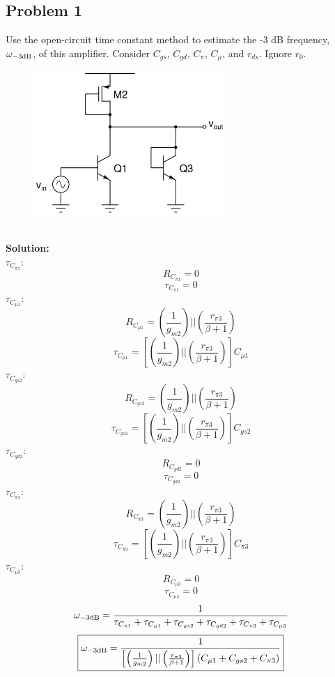 \documentclass{article}
\begin{document}
\subsection*{Problem 1}
Use the open-circuit time constant method to estimate the -3 dB frequency, $\omega_{\rm -3 dB}$, of this amplifier.  Consider $C_{gs}$, $C_{gd}$, $C_{\pi}$, $C_{\mu}$, and $r_{ds}$.  Ignore $r_0$. \\ 
\begin{figure}[!h]
\begin{center}
    \includegraphics[width=0.65\textwidth]{figures/cc_octc2.png}
\end{center}
\end{figure} \\
\textbf{Solution:} \\
$\tau_{C_{\pi 1}}$:
$$R_{C_{\pi 1}} = 0$$
$$\boxed{\tau_{C_{\pi 1}} = 0}$$
$\tau_{C_{\mu 1}}$:
$$R_{C_{\mu 1}} = \left(\frac{1}{g_{m2}}\right) || \left(\frac{r_{\pi 3}}{\beta + 1}\right) $$
$$\boxed{\tau_{C_{\mu 1}} = \left[\left(\frac{1}{g_{m2}}\right) || \left(\frac{r_{\pi 3}}{\beta + 1}\right)\right]C_{\mu 1}}$$
$\tau_{C_{gs2}}$:
$$R_{C_{gs2}} = \left(\frac{1}{g_{m2}}\right) || \left(\frac{r_{\pi 3}}{\beta + 1}\right) $$
$$\boxed{\tau_{C_{gs2}} = \left[\left(\frac{1}{g_{m2}}\right) || \left(\frac{r_{\pi 3}}{\beta + 1}\right)\right]C_{gs 2}}$$
$\tau_{C_{gd2}}$:
$$R_{C_{gd2}} = 0$$
$$\boxed{\tau_{C_{gd2}} = 0}$$
$\tau_{C_{\pi 3}}$:
$$R_{C_{\pi 3}} = \left(\frac{1}{g_{m2}}\right) || \left(\frac{r_{\pi 3}}{\beta + 1}\right) $$
$$\boxed{\tau_{C_{\pi 3}} = \left[\left(\frac{1}{g_{m2}}\right) || \left(\frac{r_{\pi 3}}{\beta + 1}\right)\right]C_{\pi 3}}$$
$\tau_{C_{\mu 3}}$:
$$R_{C_{\mu 3}} = 0 $$
$$\boxed{\tau_{C_{\mu 3}} = 0}$$
$$\omega_{\rm -3dB} = \frac{1}{\tau_{C_{\pi 1}} + \tau_{C_{\mu 1}} + \tau_{C_{gs2}} + \tau_{C_{gd2}} + \tau_{C_{\pi 3}} + \tau_{C_{\mu 3}}}$$
$$\boxed{\omega_{\rm -3 dB} = \frac{1}{\left[\left(\frac{1}{g_{m2}}\right) || \left(\frac{r_{\pi 3}}{\beta + 1}\right)\right](C_{\mu 1} + C_{gs 2} + C_{\pi 3})}}$$
\newpage
\end{document}
